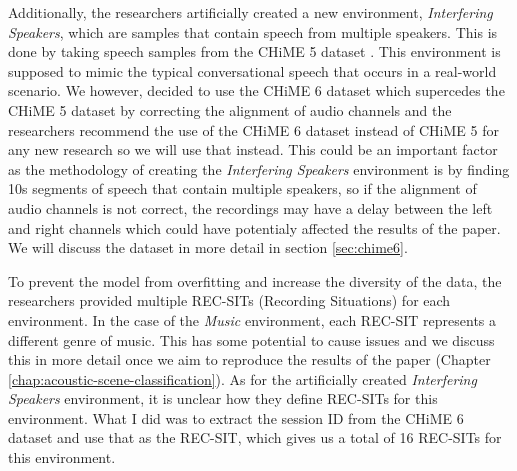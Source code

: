 \documentclass[logo,bsc,singlespacing,parskip,online]{infthesis}
\begin{document}
Additionally, the researchers artificially created a new environment, \textit{Interfering Speakers}, which are samples that contain speech from multiple speakers. 
This is done by taking speech samples from the CHiME 5 dataset \cite{barker18_fifth_2018}. This environment is supposed to mimic the 
typical conversational speech that occurs in a real-world scenario. We however, decided to use the CHiME 6 dataset which 
supercedes the CHiME 5 dataset \cite{barker18_fifth_2018} by correcting the alignment of audio channels and the researchers 
recommend the use of the CHiME 6 dataset instead of CHiME 5 for any new research so we will use that instead. This could 
be an important factor as the methodology of creating the \textit{Interfering Speakers} environment is by finding 10s 
segments of speech that contain multiple speakers, so if the alignment of audio channels is not correct, the recordings 
may have a delay between the left and right channels which could have potentialy affected the results of the paper. We will discuss the dataset in more detail in section \ref{sec:chime6}.

To prevent the model from overfitting and increase the diversity of the data, the researchers provided multiple REC-SITs (Recording Situations) for each environment.
In the case of the \textit{Music} environment, each REC-SIT represents a different genre of music. This has some potential to cause issues 
and we discuss this in more detail once we aim to reproduce the results of the paper (Chapter \ref{chap:acoustic-scene-classification}). 
As for the artificially created \textit{Interfering Speakers} environment, it is unclear how they define REC-SITs for this environment. 
What I did was to extract the session ID from the CHiME 6 dataset and use that as the REC-SIT, which 
gives us a total of 16 REC-SITs for this environment.

\end{document}
